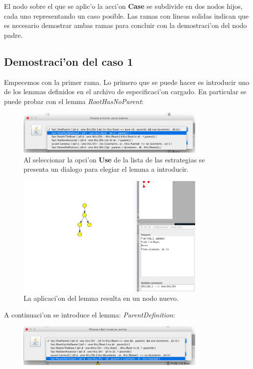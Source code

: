 El nodo sobre el que se aplic'o la acci'on \textbf{Case} se subdivide en dos nodos hijos, cada uno representando un caso posible. Las ramas con lineas solidas indican que es necesario demostrar ambas ramas para concluir con la demostraci'on del nodo padre.

\subsection{Demostraci'on del caso 1}

Empecemos con la primer rama. Lo primero que se puede hacer es introducir uno de los lemmas definidos en el archivo de especificaci'on cargado. En particular se puede probar con el lemma \textit{RootHasNoParent}:

\begin{figure}[H]
	\includegraphics[width=350px]{img/ejemplo/9.png}
	\centering
	\caption{Al seleccionar la opci'on \textbf{Use} de la lista de las estrategias se presenta un dialogo para elegiar el lemma a introducir.}
\end{figure}

\begin{figure}[H]
	\includegraphics[width=350px]{img/ejemplo/10.png}
	\centering
	\caption{La aplicaci'on del lemma resulta en un nodo nuevo.}
\end{figure}

A continuaci'on se introduce el lemma: \textit{ParentDefinition}:


\begin{figure}[H]
	\includegraphics[width=350px]{img/ejemplo/11.png}
	\centering
	\caption{}
\end{figure}

